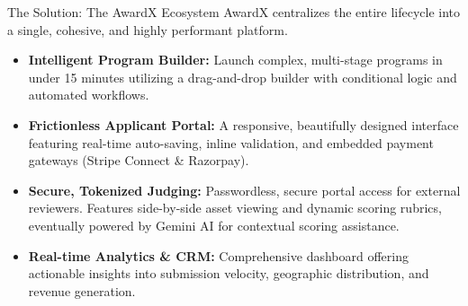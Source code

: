 \documentclass[aspectratio=169, 10pt]{beamer}
\begin{document}
\begin{frame}{The Solution: The AwardX Ecosystem}
    AwardX centralizes the entire lifecycle into a single, cohesive, and highly performant platform.
    \vspace{0.4cm}
    
    \begin{itemize}
        \item \textbf{\textcolor{CorporateSecondary}{Intelligent Program Builder:}} Launch complex, multi-stage programs in under 15 minutes utilizing a drag-and-drop builder with conditional logic and automated workflows.
        \vspace{0.2cm}
        \item \textbf{\textcolor{CorporateSecondary}{Frictionless Applicant Portal:}} A responsive, beautifully designed interface featuring real-time auto-saving, inline validation, and embedded payment gateways (Stripe Connect \& Razorpay).
        \vspace{0.2cm}
        \item \textbf{\textcolor{CorporateSecondary}{Secure, Tokenized Judging:}} Passwordless, secure portal access for external reviewers. Features side-by-side asset viewing and dynamic scoring rubrics, eventually powered by Gemini AI for contextual scoring assistance.
        \vspace{0.2cm}
        \item \textbf{\textcolor{CorporateSecondary}{Real-time Analytics \& CRM:}} Comprehensive dashboard offering actionable insights into submission velocity, geographic distribution, and revenue generation.
    \end{itemize}
\end{frame}
\end{document}
